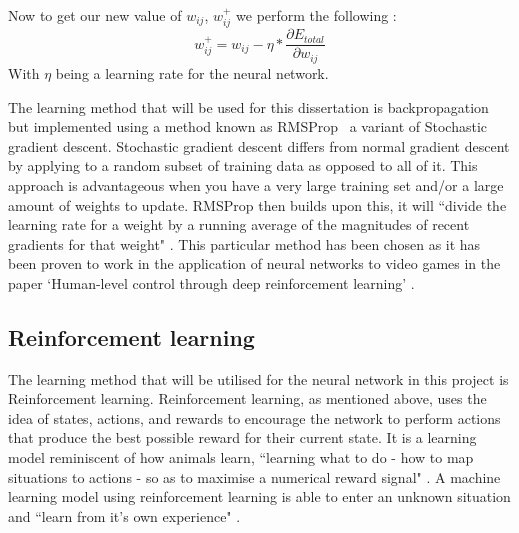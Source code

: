 \documentclass[10pt]{article}
\begin{document}
		Now to get our new value of $w_{ij}$, $w^+_{ij}$ we perform the following \cite{bpexample}:
		\begin{equation}
			w^+_{ij} = w_{ij} - \eta * \frac{\partial E_{total}}{\partial w_{ij}}
		\end{equation}
		With $\eta$ being a learning rate for the neural network.\\
		
		\medskip

		The learning method that will be used for this dissertation is backpropagation but implemented using a method known as RMSProp \cite{rms}\ a variant of Stochastic gradient descent. Stochastic gradient descent differs from normal gradient descent by applying to a random subset of training data as opposed to all of it. This approach is advantageous when you have a very large training set and/or a large amount of weights to update. RMSProp then builds upon this, it will ``divide the learning rate for a weight by a running average of the magnitudes of recent gradients for that weight" \cite{rms}. This particular method has been chosen as it has been proven to work in the application of neural networks to video games in the paper `Human-level control through deep reinforcement learning' \cite{humanlevel}.\\
	
	\bigskip
	\subsection{Reinforcement learning}
		The learning method that will be utilised for the neural network in this project is Reinforcement learning. Reinforcement learning, as mentioned above, uses the idea of states, actions, and rewards to encourage the network to perform actions that produce the best possible reward for their current state. It is a learning model reminiscent of how animals learn, ``learning what to do - how to map situations to actions - so as to maximise a numerical reward signal" \cite{rlintro}. A machine learning model using reinforcement learning is able to enter an unknown situation and ``learn from it's own experience" \cite{rlintro}.\\
		
		\medskip
		
\end{document}
